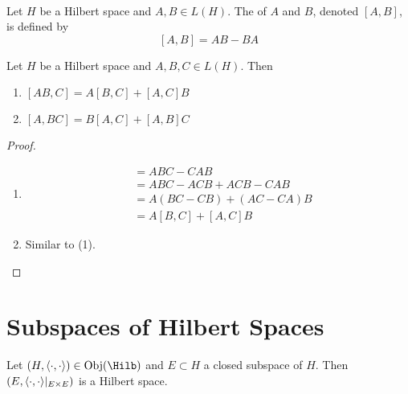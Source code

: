 \documentclass{book}
\begin{document}
\begin{defn} \ld{} \\
	Let $H$ be a Hilbert space and $A, B \in L(H)$. The  of $A$ and $B$, denoted $[A,B]$, is defined by $$[A,B] = AB - BA$$
\end{defn}

\begin{ex} \lex{}
	Let $H$ be a Hilbert space and $A,B, C \in L(H)$. Then 
	\begin{enumerate}
		\item $[AB,C] = A[B,C] + [A,C]B$
		\item $[A, BC] = B[A, C] + [A,B]C$
	\end{enumerate}
\end{ex}

\begin{proof} \
	\begin{enumerate}
		\item 
		\begin{align*}
			[AB,C]
			&= ABC - CAB\\
			&= ABC - ACB + ACB -CAB\\
			&= A(BC - CB) + (AC-CA)B\\
			&= A[B,C] + [A,C]B
		\end{align*}
		\item Similar to (1).
	\end{enumerate}
\end{proof}



































\newpage
\section{Subspaces of Hilbert Spaces}

\begin{ex}
	Let $(H, \l \cdot, \cdot \r) \in \Obj(\Hilb)$ and $E \subset H$ a closed subspace of $H$. Then $(E, \langle \cdot, \cdot \rangle|_{E \times E})$ is a Hilbert space.  
\end{ex}
\end{document}
